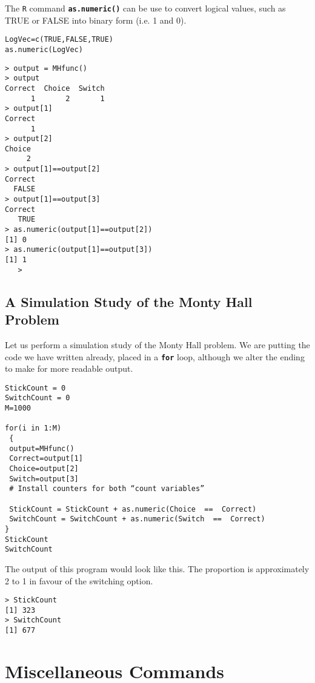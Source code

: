 The \texttt{R} command \texttt{\textbf{as.numeric()}} can be use to convert logical values, such as TRUE or FALSE into binary form (i.e. 1 and 0).

\begin{framed}
\begin{verbatim}
LogVec=c(TRUE,FALSE,TRUE)
as.numeric(LogVec)
\end{verbatim}
\end{framed}
\begin{verbatim}
> output = MHfunc()
> output
Correct  Choice  Switch
      1       2       1
> output[1]
Correct
      1
> output[2]
Choice
     2
> output[1]==output[2]
Correct
  FALSE
> output[1]==output[3]
Correct
   TRUE
> as.numeric(output[1]==output[2])
[1] 0
> as.numeric(output[1]==output[3])
[1] 1
   >
\end{verbatim}

\subsection{A Simulation Study of the Monty Hall Problem}

Let us perform a simulation study of the Monty Hall problem. We are putting the code we have written already, placed in a \texttt{\textbf{for}} loop, although we alter the ending to make for more readable output.

\begin{framed}
\begin{verbatim}
StickCount = 0
SwitchCount = 0
M=1000

for(i in 1:M)
 {
 output=MHfunc()
 Correct=output[1]
 Choice=output[2]
 Switch=output[3]
 # Install counters for both “count variables”

 StickCount = StickCount + as.numeric(Choice  ==  Correct)
 SwitchCount = SwitchCount + as.numeric(Switch  ==  Correct)
}
StickCount
SwitchCount
\end{verbatim}
\end{framed}

The output of this program would look like this. The proportion is approximately 2 to 1 in favour of the switching option.
\begin{verbatim}
> StickCount
[1] 323
> SwitchCount
[1] 677
\end{verbatim}
\newpage

\section{Miscellaneous Commands}

